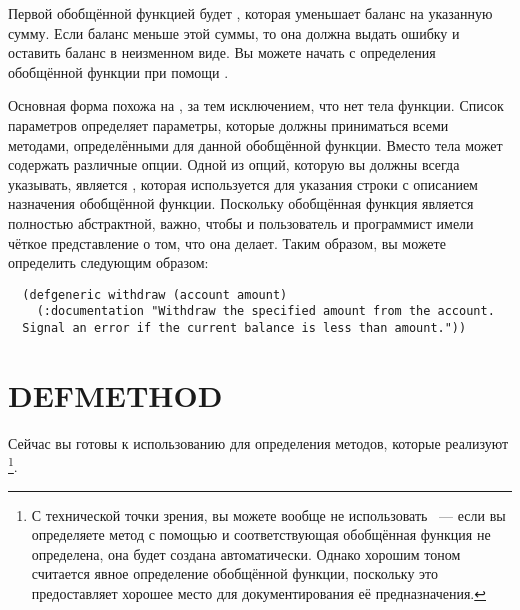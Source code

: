 
Первой обобщённой функцией будет , которая уменьшает баланс на указанную
сумму.  Если баланс меньше этой суммы, то она должна выдать ошибку и оставить баланс в
неизменном виде.  Вы можете начать с определения обобщённой функции при помощи
.

Основная форма  похожа на , за тем исключением, что нет тела
функции.  Список параметров  определяет параметры, которые должны
приниматься всеми методами, определёнными для данной обобщённой функции.  Вместо тела
 может содержать различные опции.  Одной из опций, которую вы должны
всегда указывать, является , которая используется для указания строки
с описанием назначения обобщённой функции.  Поскольку обобщённая функция является
полностью абстрактной, важно, чтобы и пользователь и программист имели чёткое
представление о том, что она делает.  Таким образом, вы можете определить 
следующим образом:

\begin{lstlisting}
  (defgeneric withdraw (account amount)
    (:documentation "Withdraw the specified amount from the account.
  Signal an error if the current balance is less than amount."))
\end{lstlisting}

\section{DEFMETHOD}

Сейчас вы готовы к использованию  для определения методов, которые
реализуют \footnote{С технической точки зрения, вы можете вообще не
  использовать ~--- если вы определяете метод с помощью  и
  соответствующая обобщённая функция не определена, она будет создана автоматически.
  Однако хорошим тоном считается явное определение обобщённой функции, поскольку это
  предоставляет хорошее место для документирования её предназначения.}.

